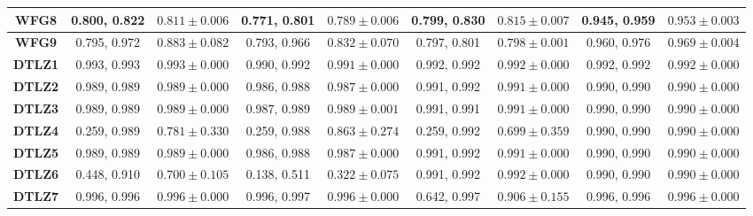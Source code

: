 \begin{table*}[t]
\begin{tabular}{c|c|c|c|c|c|c|c|c|}
\multicolumn{1}{|c|}{\textbf{WFG8}}  & 0.800, 0.822            & $0.811 \pm 0.006$       & 0.771, 0.801            & $0.789 \pm 0.006$       & 0.799, 0.830            & $0.815 \pm 0.007$       & 0.945, 0.959            & $0.953 \pm 0.003$       \\ \hline
\multicolumn{1}{|c|}{\textbf{WFG9}}  & 0.795, 0.972            & $0.883 \pm 0.082$       & 0.793, 0.966            & $0.832 \pm 0.070$       & 0.797, 0.801            & $0.798 \pm 0.001$       & 0.960, 0.976            & $0.969 \pm 0.004$       \\ \hline
\multicolumn{1}{|c|}{\textbf{DTLZ1}} & 0.993, 0.993            & $0.993 \pm 0.000$       & 0.990, 0.992            & $0.991 \pm 0.000$       & 0.992, 0.992            & $0.992 \pm 0.000$       & 0.992, 0.992            & $0.992 \pm 0.000$       \\ \hline
\multicolumn{1}{|c|}{\textbf{DTLZ2}} & 0.989, 0.989            & $0.989 \pm 0.000$       & 0.986, 0.988            & $0.987 \pm 0.000$       & 0.991, 0.992            & $0.991 \pm 0.000$       & 0.990, 0.990            & $0.990 \pm 0.000$       \\ \hline
\multicolumn{1}{|c|}{\textbf{DTLZ3}} & 0.989, 0.989            & $0.989 \pm 0.000$       & 0.987, 0.989            & $0.989 \pm 0.001$       & 0.991, 0.991            & $0.991 \pm 0.000$       & 0.990, 0.990            & $0.990 \pm 0.000$       \\ \hline
\multicolumn{1}{|c|}{\textbf{DTLZ4}} & 0.259, 0.989            & $0.781 \pm 0.330$       & 0.259, 0.988            & $0.863 \pm 0.274$       & 0.259, 0.992            & $0.699 \pm 0.359$       & 0.990, 0.990            & $0.990 \pm 0.000$       \\ \hline
\multicolumn{1}{|c|}{\textbf{DTLZ5}} & 0.989, 0.989            & $0.989 \pm 0.000$       & 0.986, 0.988            & $0.987 \pm 0.000$       & 0.991, 0.992            & $0.991 \pm 0.000$       & 0.990, 0.990            & $0.990 \pm 0.000$       \\ \hline
\multicolumn{1}{|c|}{\textbf{DTLZ6}} & 0.448, 0.910            & $0.700 \pm 0.105$       & 0.138, 0.511            & $0.322 \pm 0.075$       & 0.991, 0.992            & $0.992 \pm 0.000$       & 0.990, 0.990            & $0.990 \pm 0.000$       \\ \hline
\multicolumn{1}{|c|}{\textbf{DTLZ7}} & 0.996, 0.996            & $0.996 \pm 0.000$       & 0.996, 0.997            & $0.996 \pm 0.000$       & 0.642, 0.997            & $0.906 \pm 0.155$       & 0.996, 0.996            & $0.996 \pm 0.000$       \\ \hline

\end{tabular}
\end{table*}
